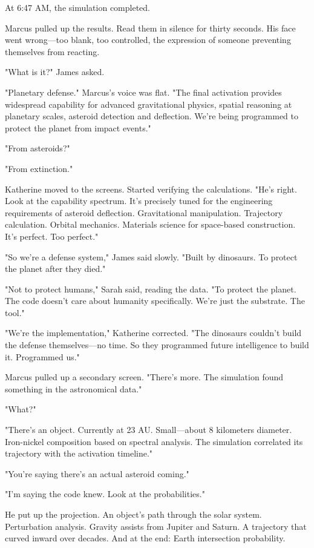 At 6:47 AM, the simulation completed.

Marcus pulled up the results. Read them in silence for thirty seconds. His face went wrong—too blank, too controlled, the expression of someone preventing themselves from reacting.

"What is it?" James asked.

"Planetary defense." Marcus's voice was flat. "The final activation provides widespread capability for advanced gravitational physics, spatial reasoning at planetary scales, asteroid detection and deflection. We're being programmed to protect the planet from impact events."

"From asteroids?"

"From extinction."

Katherine moved to the screens. Started verifying the calculations. "He's right. Look at the capability spectrum. It's precisely tuned for the engineering requirements of asteroid deflection. Gravitational manipulation. Trajectory calculation. Orbital mechanics. Materials science for space-based construction. It's perfect. Too perfect."

"So we're a defense system," James said slowly. "Built by dinosaurs. To protect the planet after they died."

"Not to protect humans," Sarah said, reading the data. "To protect the planet. The code doesn't care about humanity specifically. We're just the substrate. The tool."

"We're the implementation," Katherine corrected. "The dinosaurs couldn't build the defense themselves—no time. So they programmed future intelligence to build it. Programmed us."

Marcus pulled up a secondary screen. "There's more. The simulation found something in the astronomical data."

"What?"

"There's an object. Currently at 23 AU. Small—about 8 kilometers diameter. Iron-nickel composition based on spectral analysis. The simulation correlated its trajectory with the activation timeline."

"You're saying there's an actual asteroid coming."

"I'm saying the code knew. Look at the probabilities."

He put up the projection. An object's path through the solar system. Perturbation analysis. Gravity assists from Jupiter and Saturn. A trajectory that curved inward over decades. And at the end: Earth intersection probability.

